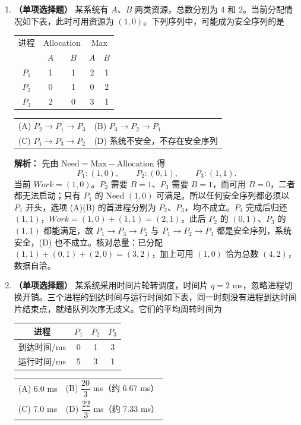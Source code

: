 \begin{enumerate}[resume]

\item \textbf{（单项选择题）} 某系统有 $A$、$B$ 两类资源，总数分别为 4 和 2。当前分配情况如下表，此时可用资源为 $(1,0)$。下列序列中，可能成为安全序列的是
\begin{center}
\begin{tabular}{|c|cc|cc|}
\hline
进程 & \multicolumn{2}{c|}{Allocation} & \multicolumn{2}{c|}{Max} \\
 & $A$ & $B$ & $A$ & $B$ \\
\hline
$P_1$ & 1 & 1 & 2 & 1 \\
$P_2$ & 0 & 1 & 0 & 2 \\
$P_3$ & 2 & 0 & 3 & 1 \\
\hline
\end{tabular}
\end{center}
\begin{center}
\begin{tabular}{ll}
(A) $P_2\to P_1\to P_3$ & (B) $P_3\to P_2\to P_1$ \\[4pt]
(C) $P_1\to P_3\to P_2$ & (D) 系统不安全，不存在安全序列
\end{tabular}
\end{center}

\ifshowsolutions\par\noindent\textbf{解析：} 先由 $\text{Need}=\text{Max}-\text{Allocation}$ 得
\[
P_1:(1,0),\qquad P_2:(0,1),\qquad P_3:(1,1).
\]
当前 $Work=(1,0)$。$P_2$ 需要 $B=1$、$P_3$ 需要 $B=1$，而可用 $B=0$，二者都无法启动；只有 $P_1$ 的 Need $(1,0)$ 可满足。所以任何安全序列都必须以 $P_1$ 开头，选项 (A)(B) 的首进程分别为 $P_2$、$P_3$，均不成立。$P_1$ 完成后归还 $(1,1)$，$Work=(1,0)+(1,1)=(2,1)$，此后 $P_2$ 的 $(0,1)$、$P_3$ 的 $(1,1)$ 都能满足，故 $P_1\to P_3\to P_2$ 与 $P_1\to P_2\to P_3$ 都是安全序列，系统安全，(D) 也不成立。核对总量：已分配 $(1,1)+(0,1)+(2,0)=(3,2)$，加上可用 $(1,0)$ 恰为总数 $(4,2)$，数据自洽。\else \answerarea[8] \fi

\vspace{8pt}

\item \textbf{（单项选择题）} 某系统采用时间片轮转调度，时间片 $q=2$ ms，忽略进程切换开销。三个进程的到达时间与运行时间如下表，同一时刻没有进程到达时间片结束点，就绪队列次序无歧义。它们的平均周转时间为
\begin{center}
\begin{tabular}{|c|ccc|}
\hline
进程 & $P_1$ & $P_2$ & $P_3$ \\
\hline
到达时间/ms & 0 & 1 & 3 \\
运行时间/ms & 5 & 3 & 1 \\
\hline
\end{tabular}
\end{center}
\begin{center}
\begin{tabular}{ll}
(A) $6.0$ ms & (B) $\dfrac{20}{3}$ ms（约 6.67 ms） \\[4pt]
(C) $7.0$ ms & (D) $\dfrac{22}{3}$ ms（约 7.33 ms）
\end{tabular}
\end{center}


\end{enumerate}
